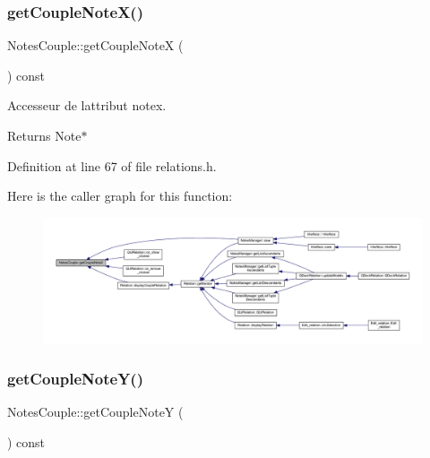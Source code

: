 \subsubsection{\texorpdfstring{get\+Couple\+Note\+X()}{getCoupleNoteX()}}
{\footnotesize\ttfamily Notes\+Couple\+::get\+Couple\+NoteX (\begin{DoxyParamCaption}{ }\end{DoxyParamCaption}) const\hspace{0.3cm}{\ttfamily [inline]}}



Accesseur de l\textquotesingle{}attribut notex. 

\begin{DoxyReturn}{Returns}
Note$\ast$ 
\end{DoxyReturn}


Definition at line 67 of file relations.\+h.

Here is the caller graph for this function\+:\nopagebreak
\begin{figure}[H]
\begin{center}
\leavevmode
\includegraphics[width=350pt]{class_notes_couple_a982a3efc376c58fb82cf508187cfb726_icgraph}
\end{center}
\end{figure}
\mbox{\label{class_notes_couple_a88ed049d759024520c07f1412a6a7d0a}} 
\subsubsection{\texorpdfstring{get\+Couple\+Note\+Y()}{getCoupleNoteY()}}
{\footnotesize\ttfamily Notes\+Couple\+::get\+Couple\+NoteY (\begin{DoxyParamCaption}{ }\end{DoxyParamCaption}) const\hspace{0.3cm}{\ttfamily [inline]}}



